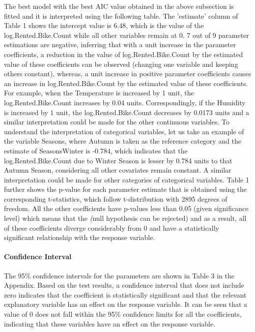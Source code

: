 \documentclass[12 pt]{scrartcl}
\begin{document}
The best model with the best AIC value obtained in the above subsection is fitted and it
is interpreted using the following table. The ’estimate’ column of Table 1 shows the intercept value is 6.48, which is the value of the log.Rented.Bike.Count while all other variables remain at 0.  7 out of 9 parameter estimations are negative, inferring that with a unit increase in the parameter coefficients, a reduction in the value of log.Rented.Bike.Count by the estimated value of these coefficients can be observed (changing one variable and keeping others constant), whereas, a unit increase in positive parameter coefficients causes an increase in log.Rented.Bike.Count by the estimated value of these coefficients. For example, when the Temperature is increased by 1 unit, the log.Rented.Bike.Count increases by 0.04 units. Correspondingly, if the Humidity is increased by 1 unit, the log.Rented.Bike.Count decreases by 0.0173 units and a similar interpretation could be made for the other continuous variables. To understand the interpretation of categorical variables, let us take an example of the
variable Seasons, where Autumn is taken as the reference category and the estimate of SeasonsWinter is -0.784, which indicates that the log.Rented.Bike.Count due to Winter Season is lesser by 0.784 units to that Autumn Season, considering all other covariates remain constant. A similar interpretation could be made for other categories of categorical variables. Table 1 further shows the p-value for each parameter estimate that is obtained using
the corresponding t-statistics, which follow t-distribution with 2895 degrees of freedom. All the other coefficients have p-values less than 0.05 (given significance level) which means that the \emph(null hypothesis can be rejected) and as a result, all of these coefficients diverge considerably from 0 and have a statistically significant relationship with the response variable.



\paragraph{Confidence Interval}
The 95\% confidence intervals for the parameters are shown in Table 3 in the Appendix. Based on the test results, a confidence interval that does not include zero indicates that the coefficient is statistically significant and that the relevant explanatory variable has an effect on the response variable. It can be seen that a value of 0 does not fall within the 95\% confidence limits for all the coefficients, indicating that these variables have an effect on the response variable. 
\end{document}
